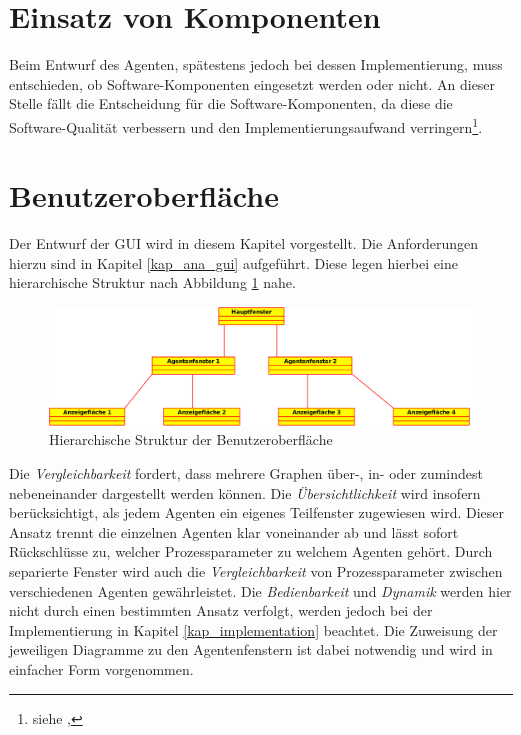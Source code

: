\documentclass[a4paper,12pt,oneside,openright,onecolumn,final,titlepage,fleqn,ngerman]{scrreprt}
\begin{document}
	\section{Einsatz von Komponenten}
	Beim Entwurf des Agenten, spätestens jedoch bei dessen Implementierung, muss entschieden, ob Software-Komponenten eingesetzt werden oder nicht. An dieser Stelle fällt die Entscheidung für die Software-Komponenten, da diese die Software-Qualität verbessern und den Implementierungsaufwand verringern\footnote{siehe , }.
	
	\section{Benutzeroberfläche}
	Der Entwurf der GUI wird in diesem Kapitel vorgestellt. Die Anforderungen hierzu sind in Kapitel \ref{kap_ana_gui} aufgeführt. Diese legen hierbei eine hierarchische Struktur nach Abbildung \ref{img_strukt_gui} nahe.
	\begin{figure}[ht]
		\centering
		\includegraphics[keepaspectratio=true,width=\textwidth]{res/Struktur_GUI.png}
		\caption{Hierarchische Struktur der Benutzeroberfläche}
		\label{img_strukt_gui}
	\end{figure}
	
	Die \emph{Vergleichbarkeit} fordert, dass mehrere Graphen über-, in- oder zumindest nebeneinander dargestellt werden können. Die \emph{Übersichtlichkeit} wird insofern berücksichtigt, als jedem Agenten ein eigenes Teilfenster zugewiesen wird. Dieser Ansatz trennt die einzelnen Agenten klar voneinander ab und lässt sofort Rückschlüsse zu, welcher Prozessparameter zu welchem Agenten gehört. Durch separierte Fenster wird auch die \emph{Vergleichbarkeit} von Prozessparameter zwischen verschiedenen Agenten gewährleistet. Die \emph{Bedienbarkeit} und \emph{Dynamik} werden hier nicht durch einen bestimmten Ansatz verfolgt, werden jedoch bei der Implementierung in Kapitel \ref{kap_implementation} beachtet. Die Zuweisung der jeweiligen Diagramme zu den Agentenfenstern ist dabei notwendig und wird in einfacher Form vorgenommen.
	
\end{document}
